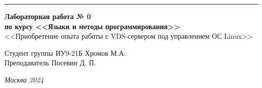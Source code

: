 \documentclass[a4paper, 14pt]{extarticle}
\begin{document}
\begin{titlepage}
\vspace*{-16pt}
\hspace{30pt}\rule{0.866\textwidth}{0.4pt}
  
\vspace{11em}

\begin{center}
\Large {\bf Лабораторная работа № 0} \\ 
\large {\bf по курсу <<Языки и методы программирования>>} \\ 
\large <<Приобретение опыта работы с VDS-сервером под управлением ОС Linux>>
\end{center}\normalsize

\vspace{8em}


\begin{flushright}
  {Студент группы ИУ9-21Б Хромов М.А.\hspace*{15pt} \\
  \vspace{2ex}
  Преподаватель Посевин Д. П.\hspace*{15pt}}
\end{flushright}

\bigskip

\vfill
 

\begin{center}
\textsl{Москва 2024}
\end{center}
\end{titlepage}

\renewcommand{\ttdefault}{pcr}

\setlength{\tabcolsep}{3pt}
\newpage
\end{document}
